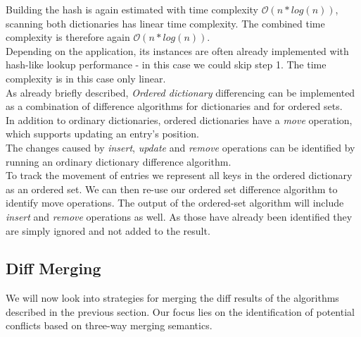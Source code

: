 Building the hash is again estimated with time complexity $ \mathcal O(n * log(n)) $, scanning both dictionaries has linear time complexity. The combined time complexity is therefore again $ \mathcal O(n * log(n)) $.\\
Depending on the application, its instances are often already implemented with hash-like lookup performance - in this case we could skip step 1.
The time complexity is in this case only linear.\\

As already briefly described, \emph{Ordered dictionary} differencing can be implemented as a combination of difference algorithms for dictionaries and for ordered sets.\\
In addition to ordinary dictionaries, ordered dictionaries have a \emph{move} operation, which supports updating an entry's position.\\
The changes caused by \emph{insert}, \emph{update} and \emph{remove} operations can be identified by running an ordinary dictionary difference algorithm.\\
To track the movement of entries we represent all keys in the ordered dictionary as an ordered set.
We can then re-use our ordered set difference algorithm to identify move operations.
The output of the ordered-set algorithm will include \emph{insert} and \emph{remove} operations as well.
As those have already been identified they are simply ignored and not added to the result.\\

\subsection{Diff Merging}
\label{sec:histo.merging.merge}

We will now look into strategies for merging the diff results of the algorithms described in the previous section.
Our focus lies on the identification of potential conflicts based on three-way merging semantics.\\

